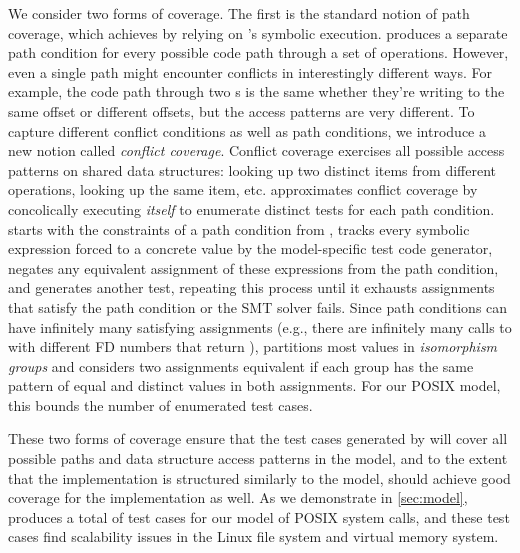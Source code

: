 We consider two forms of coverage.
The first is the standard notion of path coverage, which \testgen
achieves by relying on \analyzer's symbolic execution.
%
\analyzer produces a separate path condition for every possible code
path through a set of operations.
%
However, even a single path might encounter conflicts in interestingly
different ways.
%
For example, the code path through two s is the
same whether they're writing to the same offset or different offsets,
but the access patterns are very different.
%
To capture different conflict conditions as well as path conditions, we
introduce a new notion called \emph{conflict coverage}.  Conflict coverage
exercises all possible access patterns on shared data structures:
looking up two distinct items from different operations, looking up
the same item, etc.
%
\testgen approximates
conflict coverage by concolically executing \emph{itself}
to enumerate distinct tests for each path condition.  \testgen
starts with the constraints of a path condition from \analyzer, tracks
every symbolic expression forced to a concrete value by the
model-specific test code
generator, negates any equivalent assignment of these expressions from
the path condition, and generates another test, repeating this process
until it exhausts assignments that satisfy the path condition or the SMT
solver fails.  Since
path conditions can have infinitely many satisfying assignments (e.g.,
there are infinitely many calls to  with different FD numbers
that return ), \testgen partitions most values in
\emph{isomorphism groups} and considers two assignments equivalent if
each group has the same
pattern of equal and distinct values in both assignments.  For our POSIX
model, this
bounds the number of enumerated test cases.

These two forms of coverage ensure that the test cases
generated by \testgen will cover all possible paths and data structure
access patterns in the model, and to the extent that the implementation
is structured similarly to the model, should achieve good coverage
for the implementation as well.  As we demonstrate in \cref{sec:model},
\testgen produces a total of  test cases
for our model of  POSIX
system calls, and these
test cases find scalability issues in the Linux  file system
and virtual memory system.


\subsection{\mtrace}
\label{sec:tool:mtrace}

